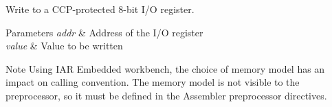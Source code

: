 Write to a C\-C\-P-\/protected 8-\/bit I/\-O register. 


\begin{DoxyParams}{Parameters}
{\em addr} & Address of the I/\-O register \\
\hline
{\em value} & Value to be written\\
\hline
\end{DoxyParams}
\begin{DoxyNote}{Note}
Using I\-A\-R Embedded workbench, the choice of memory model has an impact on calling convention. The memory model is not visible to the preprocessor, so it must be defined in the Assembler preprocessor directives. 
\end{DoxyNote}
